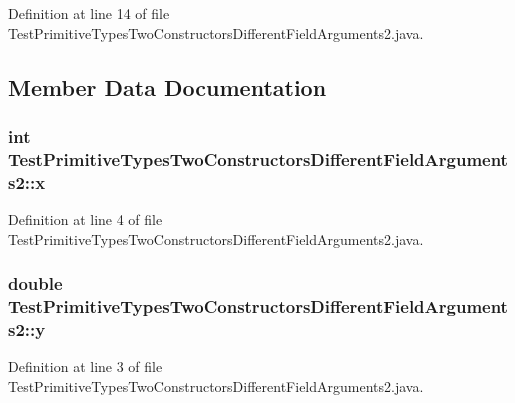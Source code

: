 Definition at line 14 of file TestPrimitiveTypesTwoConstructorsDifferentFieldArguments2.java.



\subsection{Member Data Documentation}
\hypertarget{classTestPrimitiveTypesTwoConstructorsDifferentFieldArguments2_ae9b62cc07987a2b7d2ad99d31b53e3e2}{
\subsubsection[{x}]{\setlength{\rightskip}{0pt plus 5cm}int {\bf TestPrimitiveTypesTwoConstructorsDifferentFieldArguments2::x}}}
\label{classTestPrimitiveTypesTwoConstructorsDifferentFieldArguments2_ae9b62cc07987a2b7d2ad99d31b53e3e2}


Definition at line 4 of file TestPrimitiveTypesTwoConstructorsDifferentFieldArguments2.java.

\hypertarget{classTestPrimitiveTypesTwoConstructorsDifferentFieldArguments2_a1022b1a98ab1e4b04e7a1647d4f4f542}{
\subsubsection[{y}]{\setlength{\rightskip}{0pt plus 5cm}double {\bf TestPrimitiveTypesTwoConstructorsDifferentFieldArguments2::y}}}
\label{classTestPrimitiveTypesTwoConstructorsDifferentFieldArguments2_a1022b1a98ab1e4b04e7a1647d4f4f542}


Definition at line 3 of file TestPrimitiveTypesTwoConstructorsDifferentFieldArguments2.java.



